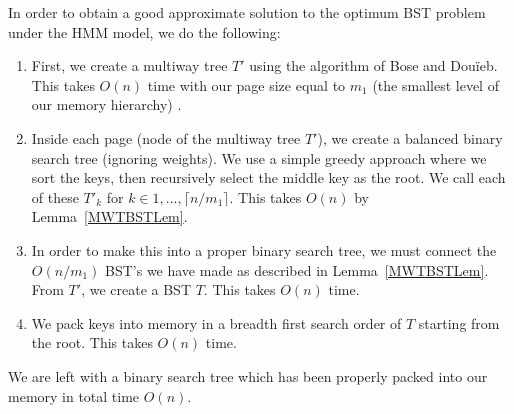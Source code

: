 \documentclass[letterpaper,12pt,titlepage,oneside,final]{book}
\theoremstyle{plain}
\begin{document}
In order to obtain a good approximate solution to the optimum BST problem under the HMM model, we do the following:

\begin{enumerate}
\item First, we create a multiway tree $T'$ using the algorithm of Bose and Dou\"{i}eb. This takes $O(n)$ time with our page size equal to $m_1$ (the smallest level of our memory hierarchy) \cite{bose2009efficient}.

\item Inside each page (node of the multiway tree $T'$), we create a balanced binary search tree (ignoring weights). We use a simple greedy approach where we sort the keys, then recursively select the middle key as the root.  We call each of these $T'_k$ for $k \in {1,...,\lceil n/m_1 \rceil}$. This takes $O(n)$ by Lemma~\ref{MWTBSTLem}.

\item In order to make this into a proper binary search tree, we must connect the $O(n/m_1)$ BST's we have made as described in Lemma~\ref{MWTBSTLem}. From $T'$, we create a BST $T$. This takes $O(n)$ time.

\item We pack keys into memory in a breadth first search order of $T$ starting from the root. This takes $O(n)$ time.

\end{enumerate}

\noindent We are left with a binary search tree which has been properly packed into our memory in total time $O(n)$.
\end{document}
